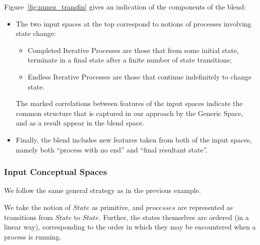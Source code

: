 Figure~\ref{fig:nunez_transfin} gives an indication of the components
of the blend:
\begin{itemize}
\item The two input spaces at the top correspond to notions
of processes involving state change:
\begin{itemize}
\item  Completed Iterative Processes
are those that from some initial state, terminate in a final state
after a finite number of state transitions;
\item 
Endless Iterative Processes are those that continue indefinitely
to change state.
\end{itemize}
The marked correlations between features of the input spaces
indicate the common structure that is captured in our approach
by the Generic Space, and as a result appear in the blend space.
\item 
Finally, the blend includes new features taken from both of the
input spaces, namely both ``process with no end'' and 
``final resultant state''.
\end{itemize}

\subsubsection{Input Conceptual Spaces}

We follow the same general strategy as in the previous example.

We take the notion of $State$ as primitive, and $processes$ are
represented as transitions from $State$ to $State$.  Further, the states
themselves are ordered (in a linear way), corresponding to the order
in which they may be encountered when a process is running.

